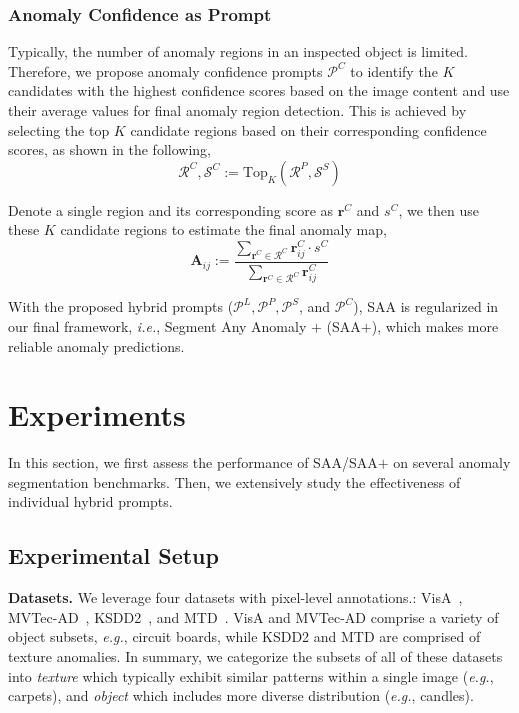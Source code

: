 \documentclass{article}
\begin{document}
\subsubsection{Anomaly Confidence as Prompt}

Typically, the number of anomaly regions in an inspected object is limited. Therefore, we propose anomaly confidence prompts $\mathcal{P}^C$ to identify the $K$ candidates with the highest confidence scores based on the image content and use their average values for final anomaly region detection. This is achieved by selecting the top $K$ candidate regions based on their corresponding confidence scores, as shown in the following,
\begin{equation}
\label{eq:confidence-prompts}
    \mathcal{R}^C, \mathcal{S}^C := \mathrm{Top}_K(\mathcal{R}^P,\mathcal{S}^S)
\end{equation}

Denote a single region and its corresponding score as $\mathbf{r}^C$ and $s^C$, we then use these $K$ candidate regions to estimate the final anomaly map, 
\begin{equation}
\label{eq:fusion}
    \mathbf{A}_{ij} := \frac{ \sum_{\mathbf{r}^C \in \mathcal{R}^C}
    \mathbf{r}^C_{i j} \cdot s^C}{
    \sum_{\mathbf{r}^C \in \mathcal{R}^C}
    \mathbf{r}^C_{i j}}   
\end{equation}

With the proposed hybrid prompts ($ \mathcal{P}^L, \mathcal{P}^P,\mathcal{P}^S$, and $\mathcal{P}^C$), SAA is regularized in our final framework, \textit{i.e.}, Segment Any Anomaly $+$ (SAA$+$), which makes more reliable anomaly predictions.



\section{Experiments}
\label{sec:experiment}
In this section, we first assess the performance of SAA/SAA$+$ on several anomaly segmentation benchmarks. Then, we extensively study the effectiveness of individual hybrid prompts.

\subsection{Experimental Setup}

\noindent\textbf{Datasets.} We leverage four datasets with pixel-level annotations.: VisA~\cite{zou2022spot}, MVTec-AD~\cite{bergmann2019mvtec}, KSDD2~\cite{bozic_mixed_2021}, and MTD~\cite{mtd2018}. VisA and MVTec-AD comprise a variety of object subsets, \textit{e.g.}, circuit boards, while KSDD2 and MTD are comprised of texture anomalies. 
In summary, we categorize the subsets of all of these datasets into \textit{texture} which typically exhibit similar patterns within a single image (\textit{e.g.}, carpets), and \textit{object}  which includes more diverse distribution (\textit{e.g.}, candles). 
\end{document}
